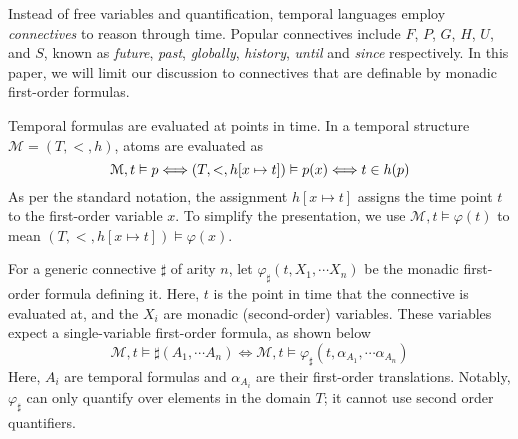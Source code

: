 \documentclass[a4paper,UKenglish,cleveref, autoref, thm-restate, numberwithinsect]{lipics-v2021}
\begin{document}
Instead of free variables and quantification, temporal languages employ \textit{connectives} to reason through time. Popular connectives include $F$, $P$, $G$, $H$, $U$, and $S$, known as \textit{future}, \textit{past}, \textit{globally}, \textit{history}, \textit{until} and \textit{since} respectively. In this paper, we will limit our discussion to connectives that are definable by monadic first-order formulas.

Temporal formulas are evaluated at points in time. In a temporal structure $\mathcal{M} = (T, <, h)$, atoms are evaluated as
\begin{equation*}
    \mathcal{M}, t \vDash p \Longleftrightarrow (T, <, h[x \mapsto t]) \vDash p(x) \Longleftrightarrow t \in h(p)\\
\end{equation*}
As per the standard notation, the assignment $h[x \mapsto t]$ assigns the time point $t$ to the first-order variable $x$. To simplify the presentation, we use $\mathcal{M}, t \vDash \varphi(t)$ to mean $(T, <, h[x \mapsto t]) \vDash \varphi(x)$.

For a generic connective $\sharp$ of arity $n$, let $\varphi_\sharp(t, X_1, \cdots X_n)$ be the monadic first-order formula defining it. Here, $t$ is the point in time that the connective is evaluated at, and the $X_i$ are monadic (second-order) variables. These variables expect a single-variable first-order formula, as shown below
\begin{equation*}
    \mathcal{M}, t \vDash \sharp(A_1, \cdots A_n) \Longleftrightarrow \mathcal{M}, t \vDash \varphi_\sharp(t, \alpha_{A_1}, \cdots \alpha_{A_n})
\end{equation*}
Here, $A_i$ are temporal formulas and $\alpha_{A_i}$ are their first-order translations. Notably, $\varphi_\sharp$ can only quantify over elements in the domain $T$; it cannot use second order quantifiers.
\end{document}
